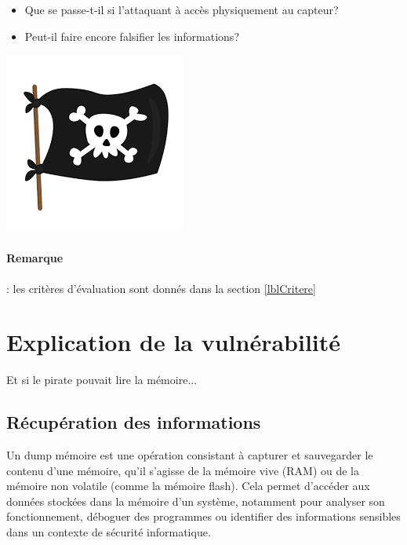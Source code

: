 \documentclass[french, 12pt]{article}%
\newcommand{\itemE}{\item[$\bullet$]}
\newcommand{\titreencadre}{Titre}
\newenvironment{encadre}[1]{\renewcommand{\titreencadre}{#1}
	\begin{mdframed}[style=encadrestyle]
	\vspace{0.5\baselineskip}
	}{%
	\end{mdframed}}
\begin{document}
\begin{minipage}{0.65\linewidth}
\begin{itemize}
\itemE Que se passe-t-il si l'attaquant à accès physiquement au capteur?
\itemE Peut-il faire encore falsifier les informations?  
\end{itemize} 
\end{minipage}
\begin{minipage}{0.25\linewidth}
\begin{center}
\includegraphics[scale=0.4]{./ressource/logoHacker.png}
\end{center}
\end{minipage}


\paragraph{Remarque } : les critères d'évaluation sont donnés dans la section \ref{lblCritere}

\section{Explication de la vulnérabilité}

Et si le pirate pouvait lire la mémoire...

\subsection{Récupération des informations}
\begin{encadre}{Dump mémoire}
Un dump mémoire est une opération consistant à capturer et sauvegarder le contenu d'une mémoire, qu'il s'agisse de la mémoire vive (RAM) ou de la mémoire non volatile (comme la mémoire flash). Cela permet d'accéder aux données stockées dans la mémoire d'un système, notamment pour analyser son fonctionnement, déboguer des programmes ou identifier des informations sensibles dans un contexte de sécurité informatique.
\end{encadre}
\end{document}
